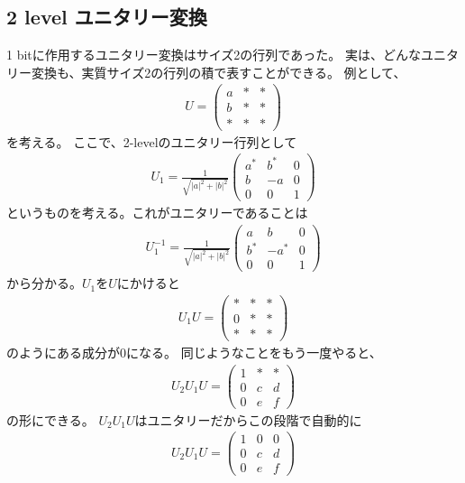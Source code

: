 \documentclass[]{ltjsarticle}
\begin{document}
\subsection{2 level ユニタリー変換}
1 bitに作用するユニタリー変換はサイズ2の行列であった。
実は、どんなユニタリー変換も、実質サイズ2の行列の積で表すことができる。
例として、
\begin{align}
    U = 
    \begin{pmatrix}
        a & * & * \\
        b & * & * \\
        * & * & * 
    \end{pmatrix}
\end{align}
を考える。
ここで、2-levelのユニタリー行列として
\begin{align}
    U_1 
    =
    \frac{1}{\sqrt{|a|^2 + |b|^2}}
    \begin{pmatrix}
        a^* & b^* & 0 \\
        b & -a & 0 \\
        0 & 0 & 1 
    \end{pmatrix}
\end{align}
というものを考える。これがユニタリーであることは
\begin{align}
    U_1^{-1}
    =
    \frac{1}{\sqrt{|a|^2 + |b|^2}}
    \begin{pmatrix}
        a & b & 0 \\
        b^* & -a^* & 0 \\
        0 & 0 & 1 
    \end{pmatrix}
\end{align}
から分かる。$U_1$を$U$にかけると
\begin{align}
    U_1U =
    \begin{pmatrix}
        * & * & * \\
        0 & * & * \\
        * & * & * 
    \end{pmatrix}
\end{align}
のようにある成分が0になる。
同じようなことをもう一度やると、
\begin{align}
    U_2U_1U =
    \begin{pmatrix}
        1 & * & * \\
        0 & c & d \\
        0 & e & f 
    \end{pmatrix}
\end{align}
の形にできる。
$U_2U_1U$はユニタリーだからこの段階で自動的に
\begin{align}
    U_2U_1U =
    \begin{pmatrix}
        1 & 0 & 0 \\
        0 & c & d \\
        0 & e & f 
    \end{pmatrix}
\end{align}
\end{document}
